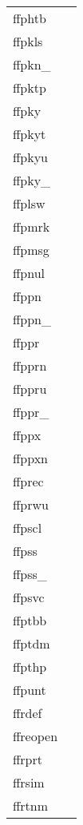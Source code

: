 \documentclass[11pt]{book}
\begin{document}
\begin{tabular}{lr}

ffphtb      & \pageref{ffphtb} \\
ffpkls  & \pageref{ffpkls} \\
ffpkn\_     & \pageref{ffpknx} \\
ffpktp & \pageref{ffpktp} \\
ffpky          & \pageref{ffpky} \\
ffpkyt   & \pageref{ffpkyt} \\
ffpkyu     & \pageref{ffpkyu} \\
ffpky\_      & \pageref{ffpkyx} \\
ffplsw & \pageref{ffplsw} \\
ffpmrk   & \pageref{ffpmrk} \\
ffpmsg   & \pageref{ffpmsg} \\
ffpnul    & \pageref{ffpnul} \\
ffppn     & \pageref{ffppn} \\
ffppn\_ & \pageref{ffppnx} \\
ffppr        & \pageref{ffppr} \\
ffpprn & \pageref{ffpprn} \\
ffppru & \pageref{ffppru} \\
ffppr\_    & \pageref{ffpprx} \\
ffppx & \pageref{ffppx} \\
ffppxn & \pageref{ffppxn} \\
ffprec       & \pageref{ffprec} \\
ffprwu      & \pageref{ffpclu} \\
ffpscl     & \pageref{ffpscl} \\
ffpss    & \pageref{ffpss} \\
ffpss\_  & \pageref{ffpssx} \\
ffpsvc    & \pageref{ffpsvc} \\
ffptbb  & \pageref{ffptbb} \\
ffptdm         & \pageref{ffptdm} \\
ffpthp    & \pageref{ffpthp} \\
ffpunt     & \pageref{ffpunt} \\
ffrdef   & \pageref{ffrdef} \\
ffreopen      & \pageref{ffreopen} \\
ffrprt   & \pageref{ffrprt} \\
ffrsim     & \pageref{ffrsim} \\
ffrtnm & \pageref{ffrtnm} \\

\end{tabular}
\end{document}
